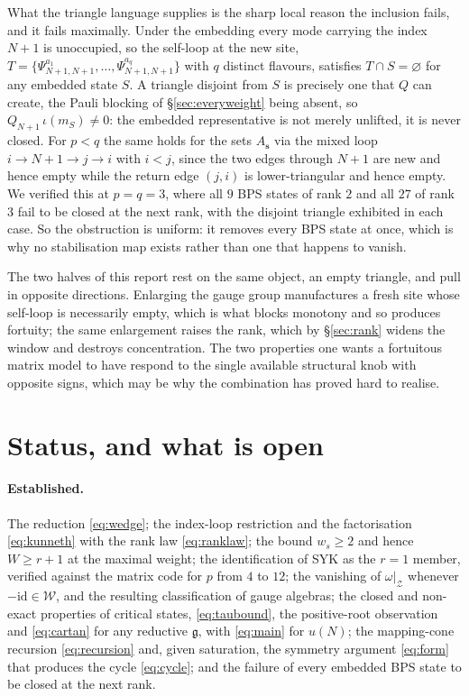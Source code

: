 \documentclass[10pt]{article}
\newcommand{\g}{\mathfrak{g}}
\newcommand{\Wg}{\mathcal{W}}
\begin{document}
What the triangle language supplies is the sharp local reason the inclusion fails, and it fails maximally. Under
the embedding every mode carrying the index $N+1$ is unoccupied, so the self-loop at the new site,
$T=\{\Psi^{a_1}_{N+1,N+1},\dots,\Psi^{a_q}_{N+1,N+1}\}$ with $q$ distinct flavours, satisfies $T\cap S=\varnothing$
for any embedded state $S$. A triangle disjoint from $S$ is precisely one that $Q$ can create, the Pauli blocking
of \S\ref{sec:everyweight} being absent, so $Q_{N+1}\,\iota(m_S)\ne0$: the embedded representative is not merely
unlifted, it is never closed. For $p<q$ the same holds for the sets $A_{\mathbf s}$ via the mixed loop
$i\to N+1\to j\to i$ with $i<j$, since the two edges through $N+1$ are new and hence empty while the return edge
$(j,i)$ is lower-triangular and hence empty. We verified this at $p=q=3$, where all $9$ BPS states of rank $2$ and
all $27$ of rank $3$ fail to be closed at the next rank, with the disjoint triangle exhibited in each case. So
the obstruction is uniform: it removes every BPS state at once, which is why no stabilisation map exists rather
than one that happens to vanish.

The two halves of this report rest on the same object, an empty triangle, and pull in opposite directions.
Enlarging the gauge group manufactures a fresh site whose self-loop is necessarily empty, which is what blocks
monotony and so produces fortuity; the same enlargement raises the rank, which by \S\ref{sec:rank} widens the
window and destroys concentration. The two properties one wants a fortuitous matrix model to have respond to the single available
structural knob with opposite signs, which may be why the combination has proved hard to realise.

\section{Status, and what is open}

\paragraph{Established.} The reduction \eqref{eq:wedge}; the index-loop restriction and the factorisation
\eqref{eq:kunneth} with the rank law \eqref{eq:ranklaw}; the bound $w_s\ge2$ and hence $W\ge r+1$ at the maximal
weight; the identification of SYK as the $r=1$ member, verified against the matrix code for $p$ from $4$ to $12$;
the vanishing of $\omega|_{\mathcal Z}$ whenever $-\mathrm{id}\in\Wg$, and the resulting classification of gauge
algebras; the closed and non-exact properties of critical states, \eqref{eq:taubound}, the positive-root
observation and \eqref{eq:cartan} for any reductive $\g$, with \eqref{eq:main} for $u(N)$; the mapping-cone
recursion \eqref{eq:recursion} and, given saturation, the symmetry argument \eqref{eq:form} that produces the
cycle \eqref{eq:cycle}; and the failure of every embedded BPS state to be closed at the next rank.
\end{document}
